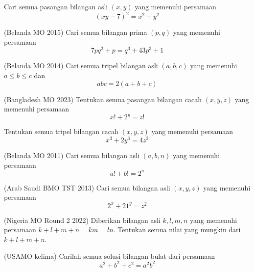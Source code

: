 \documentclass[11pt]{scrartcl}
\begin{document}
\begin{problem}
    Cari semua pasangan bilangan asli $(x, y)$ yang memenuhi persamaan $$(xy - 7)^2 = x^2 + y^2$$
\end{problem}

\begin{problem}
    (Belanda MO 2015) Cari semua bilangan prima $(p,q)$ yang memenuhi persamaan \[7pq^2 + p = q^3 + 43p^3 + 1 \]
\end{problem}

\begin{problem}
    (Belanda MO 2014) Cari semua tripel bilangan asli $(a, b, c)$ yang memenuhi $a \leq b \leq c$ dan \[abc = 2(a + b + c)\]
\end{problem}

\begin{problem}
    (Bangladesh MO 2023) Tentukan semua pasangan bilangan cacah $(x, y, z)$ yang memenuhi persamaan $$x! + 2^y = z!$$
\end{problem}

\begin{problem}
    Tentukan semua tripel bilangan cacah $(x, y, z)$ yang memenuhi persamaan $$x^3 + 2y^3 = 4z^3$$
\end{problem}

\begin{problem}
    (Belanda MO 2011) Cari semua bilangan asli $(a, b, n)$ yang memenuhi persamaan \[a! + b! = 2^n\]
\end{problem}

\begin{problem}
    (Arab Saudi BMO TST 2013) Cari semua bilangan asli $(x, y, z)$ yang memenuhi persamaan \[2^x + 21^y = z^2\]
\end{problem}


\begin{problem}
    (Nigeria MO Round 2 2022) Diberikan bilangan asli $k, l, m, n$ yang memenuhi persamaan $k + l + m + n = km = ln$. Tentukan semua nilai yang mungkin dari $k + l + m + n$.
\end{problem}

\begin{problem}
    (USAMO kelima) Carilah semua solusi bilangan bulat dari persamaan \[a^2 + b^2 + c^2 = a^2b^2\] 
\end{problem}
\end{document}
